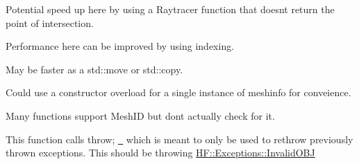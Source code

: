\begin{DoxyRefList}
\label{a00162__todo000005}%
%
Potential speed up here by using a Raytracer function that doesn\textquotesingle{}t return the point of intersection.  
\item[Member \mbox{\hyperlink{a00175_a9a8051c9b70fc0ae60337d4a38bf5f57}{HF\+::Ray\+Tracer\+::vectors\+To\+Buffers}} (const std\+::vector$<$ std\+::array$<$ float, 3 $>$$>$ \&vertices, std\+::vector$<$ Triangle $>$ \&Tribuffer, std\+::vector$<$ Vertex $>$ \&Vbuffer)]\label{a00162__todo000006}%
%
Performance here can be improved by using indexing.  
\item[Member \mbox{\hyperlink{a00175_aac8c0b245ea813969c50b6496cc67945}{HF\+::Ray\+Tracer\+::buffers\+To\+Structs}} (std\+::vector$<$ float $>$ \&in\+\_\+vertices, std\+::vector$<$ int $>$ \&in\+\_\+indices, std\+::vector$<$ Vertex $>$ \&out\+\_\+vertices, std\+::vector$<$ Triangle $>$ \&out\+\_\+triangles)]\label{a00162__todo000007}%
%
May be faster as a std\+::move or std\+::copy.  
\item[Class \mbox{\hyperlink{a01061}{HF\+::Ray\+Tracer\+::Embree\+Ray\+Tracer}} ]\label{a00162__todo000008}%
%
Could use a constructor overload for a single instance of meshinfo for conveience. 

Many functions support Mesh\+ID but don\textquotesingle{}t actually check for it.  
\item[Member \mbox{\hyperlink{a01061_ab51061e309585cc48d58a6170ccea619}{HF\+::Ray\+Tracer\+::Embree\+Ray\+Tracer\+::Embree\+Ray\+Tracer}} (std\+::vector$<$ H\+F\+::\+Geometry\+::\+Mesh\+Info $>$ \&MI)]\label{a00162__todo000009}%
%
This function calls {\ttfamily  throw; } \href{https://en.cppreference.com/w/cpp/language/throw}{\texttt{ }} which is meant to only be used to rethrow previously thrown exceptions. This should be throwing \mbox{\hyperlink{a01013}{H\+F\+::\+Exceptions\+::\+Invalid\+O\+BJ}} 
\end{DoxyRefList}